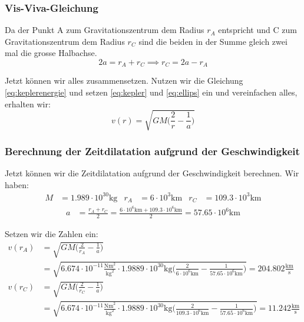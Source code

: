 \begin{refsection}
\subsubsection{Vis-Viva-Gleichung}
Da der Punkt A zum Gravitationszentrum dem Radius $r_A$ entspricht und C zum Gravitationszentrum dem Radius $r_C$ sind die beiden in der Summe gleich zwei mal die grosse Halbachse.
\begin{equation}
2a = r_A + r_C \implies r_C = 2a - r_A
\label{eq:ellips}
\end{equation}

Jetzt können wir alles zusammensetzen. Nutzen wir die Gleichung \eqref{eq:keplerenergie} und setzen \eqref{eq:kepler} und \eqref{eq:ellips} ein und vereinfachen alles, erhalten wir:
\begin{equation}
v(r) = \sqrt{GM \biggr(\frac{2}{r} - \frac{1}{a}\biggr)}
\label{visvivagleichung}
\end{equation}

\subsubsection{Berechnung der Zeitdilatation aufgrund der Geschwindigkeit}
Jetzt können wir die Zeitdilatation aufgrund der Geschwindigkeit berechnen. Wir haben:
\begin{align*}
M &= 1.989 \cdot 10^30\text{kg} & r_A & = 6\cdot 10^3\text{km} & r_C &= 109.3\cdot 10^3\text{km}
\end{align*}
\begin{align*}
a &= \frac{r_A + r_C}{2} = \frac{6\cdot 10^6\text{km} + 109.3\cdot 10^6\text{km}}{2} = 57.65\cdot 10^6 \text{km}
\end{align*}

\noindent{}Setzen wir die Zahlen ein:
\begin{align*}
v(r_A) & = \sqrt{GM \biggr(\frac{2}{r_A} - \frac{1}{a}\biggr)} 
\\
& = \sqrt{6.674 \cdot 10^{-11}\frac{\text{Nm}^2}{\text{kg}^2} \cdot 1.9889 \cdot 10^{30}\text{kg} \biggr(\frac{2}{6\cdot 10^6\text{km}} - \frac{1}{57.65\cdot 10^6 \text{km}}\biggr)} = 204.802 \frac{\text{km}}{\text{s}}
\\
v(r_C) & = \sqrt{GM \biggr(\frac{2}{r_C} - \frac{1}{a}\biggr)} \\
& = \sqrt{6.674 \cdot 10^{-11}\frac{\text{Nm}^2}{\text{kg}^2} \cdot 1.9889 \cdot 10^{30}\text{kg} \biggr(\frac{2}{109.3\cdot 10^6\text{km}} - \frac{1}{57.65\cdot 10^6 \text{km}}\biggr)} = 11.242 \frac{\text{km}}{\text{s}}
\\
\end{align*}


\end{refsection}
